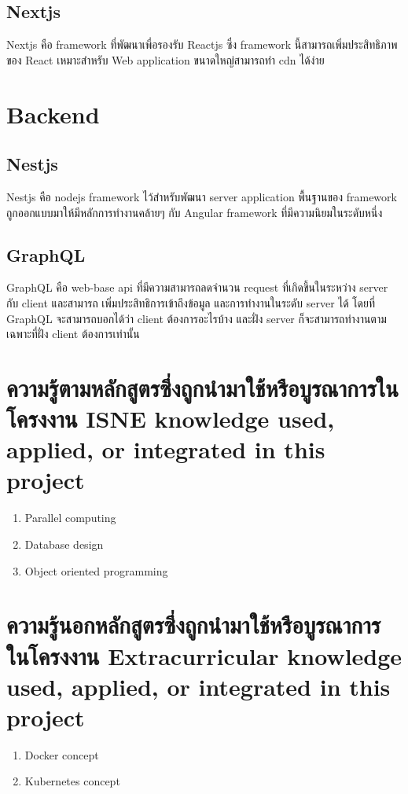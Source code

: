 \subsection{Nextjs}

Nextjs \cite{nextjs} คือ framework \cite{framework} ที่พัฒนาเพี่อรองรับ Reactjs \cite{reactjs} ซึ่ง framework นี้สามารถเพิ่มประสิทธิภาพของ React \cite{reactjs} เหมาะสำหรับ Web application ขนาดใหญ่สามารถทำ cdn \cite{cdn} ได้ง่าย

\section{Backend}

\subsection{Nestjs}

Nestjs \cite{nestjs} คือ nodejs \cite{nodejs} framework \cite{framework} ไว้สำหรับพัฒนา server application \cite {serverapplication} พื้นฐานของ framework ถูกออกแบบมาให้มีหลักการทำงานคล้ายๆ กับ Angular framework \cite{angular} ที่มีความนิยมในระดับหนึ่ง

\subsection{GraphQL}

GraphQL \cite{graphql} คือ web-base api \cite{webapi} ที่มีความสามารถลดจำนวน request ที่เกิดขึ้นในระหว่าง server กับ client และสามารถ เพิ่มประสิทธิการเข้าถึงข้อมูล และการทำงานในระดับ server ได้ โดยที่ GraphQL จะสามารถบอกได้ว่า client ต้องการอะไรบ้าง และฝั่ง server ก็จะสามารถทำงานตามเฉพาะที่ฝั่ง client ต้องการเท่านั้น

\section{\ifcpe%
ความรู้ตามหลักสูตรซึ่งถูกนำมาใช้หรือบูรณาการในโครงงาน
\else%
ISNE knowledge used, applied, or integrated in this project
\fi
}

\begin{enumerate}
    \item Parallel computing
    \item Database design
    \item Object oriented programming
\end{enumerate}

\section{\ifcpe%
ความรู้นอกหลักสูตรซึ่งถูกนำมาใช้หรือบูรณาการในโครงงาน
\else%
Extracurricular knowledge used, applied, or integrated in this project
\fi
}

\begin{enumerate}
    \item Docker concept
    \item Kubernetes concept
\end{enumerate}
